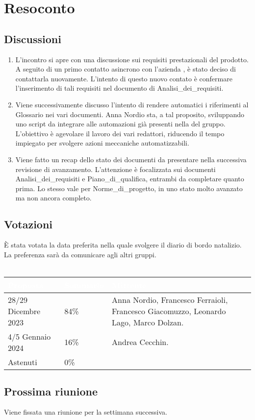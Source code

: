 \section{Resoconto} \label{sec:resoconto}
\subsection{Discussioni} \label{subsec:resdiscussione}
\begin{enumerate}
    \item L'incontro si apre con una discussione sui requisiti prestazionali del prodotto. A seguito di un primo contatto asincrono con l'azienda , è stato deciso di contattarla nuovamente. L'intento di questo nuovo contato è confermare l'inserimento di tali requisiti nel documento di Analisi\_dei\_requisiti.
    \item Viene successivamente discusso l'intento di rendere automatici i riferimenti al Glossario nei vari documenti. Anna Nordio sta, a tal proposito, sviluppando uno script da integrare alle automazioni già presenti nella  del gruppo. L'obiettivo è agevolare il lavoro dei vari redattori, riducendo il tempo impiegato per svolgere azioni meccaniche automatizzabili.
    \item Viene fatto un recap dello stato dei documenti da presentare nella successiva revisione di avanzamento. L'attenzione è focalizzata sui documenti Analisi\_dei\_requisiti e Piano\_di\_qualifica, entrambi da completare quanto prima. Lo stesso vale per Norme\_di\_progetto, in uno stato molto avanzato ma non ancora completo.
\end{enumerate}

\subsection{Votazioni} \label{subsec:resvotazione}
     È stata votata la data preferita nella quale svolgere il diario di bordo natalizio. La preferenza sarà da comunicare agli altri gruppi. \\\\
        \begingroup
            \setlength{\tabcolsep}{10pt}
            \renewcommand{\arraystretch}{1.5}
            \begin{tabularx}{0.93\textwidth}{| l | l | X |}
                 \hline
                 \rowcolor{headerrow}\textbf{\textcolor{white}{Proposta}} & \textbf{\textcolor{white}{Sommario}} & \textbf{\textcolor{white}{Mittente}} \\
                 \hline
                 28/29 Dicembre 2023 & 84\%  & Anna Nordio, Francesco Ferraioli, Francesco Giacomuzzo, Leonardo Lago, Marco Dolzan. \\
                 \hline
                 4/5 Gennaio 2024 & 16\% & Andrea Cecchin. \\
                 \hline
                 Astenuti & 0\% &  \\
                 \hline
            \end{tabularx}
        \endgroup

\subsection{Prossima riunione} \label{subsec:riunione}
Viene fissata una riunione per la settimana successiva.